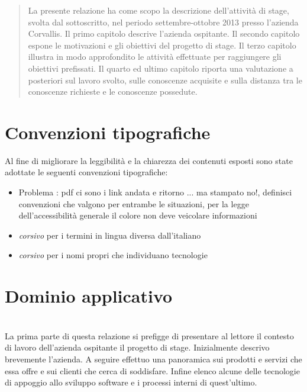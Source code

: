 \newcommand{\Versione}{1.0}%
\newcommand{\Data}{2013-01-21}%




\null\vspace{2.0in}
\begin{abstract}
La presente relazione ha come scopo la descrizione dell'attività di stage, svolta dal sottoscritto, nel periodo settembre-ottobre 2013 presso l'azienda Corvallis. Il primo capitolo descrive l'azienda ospitante. Il secondo capitolo espone le motivazioni e gli obiettivi del progetto di stage. Il terzo capitolo illustra in modo approfondito le attività effettuate per raggiungere gli obiettivi prefissati. Il quarto ed ultimo capitolo riporta una valutazione a posteriori sul lavoro svolto, sulle conoscenze acquisite e sulla distanza tra le conoscenze richieste e le conoscenze possedute.
\end{abstract}
\vspace{\fill}
%
\newpage
\section*{Convenzioni tipografiche}
Al fine di migliorare la leggibilità e la chiarezza dei contenuti esposti sono state adottate le seguenti convenzioni tipografiche:
\begin{itemize}
\item Problema : pdf ci sono i link andata e ritorno ... ma stampato no!, definisci convenzioni che valgono per entrambe le situazioni, per la legge dell'accessibilità generale il colore non deve veicolare informazioni
\item \emph{corsivo} per i termini in lingua diversa dall'italiano
\item \emph{corsivo} per i nomi propri che individuano tecnologie
\end{itemize}

\newpage
\tableofcontents

\newpage

\listoftables
\listoffigures

\newpage

\section{Dominio applicativo}\\
\label{1.0}
La prima parte di questa relazione si prefigge di presentare al lettore il contesto di lavoro dell'azienda ospitante il progetto di stage. Inizialmente descrivo brevemente l'azienda. A seguire effettuo una panoramica sui prodotti e servizi che essa offre e sui clienti che cerca di soddisfare. Infine elenco alcune delle tecnologie di appoggio allo sviluppo software e i processi interni di quest'ultimo.


